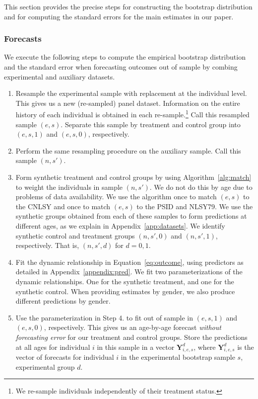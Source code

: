 \noindent This section provides the precise steps for constructing the bootstrap distribution and for computing the standard errors for the main estimates in our paper.

\subsubsection{Forecasts} \label{appendix:bootstrapspreds}

\noindent We execute the following steps to compute the empirical bootstrap distribution and the standard error when forecasting outcomes out of sample by combing experimental and auxiliary datasets.

\begin{enumerate}
\item Resample the experimental sample with replacement at the individual level. This gives us a new (re-sampled) panel dataset. Information on the entire history of each individual is obtained in each re-sample.\footnote{We re-sample individuals independently of their treatment status.} Call this resampled sample $(e,s)$. Separate this sample by treatment and control group into $(e,s,1)$ and $(e,s,0)$, respectively.

\item Perform the same resampling procedure on the auxiliary sample. Call this sample $(n,s')$.

\item Form synthetic treatment and control groups by using Algorithm~\ref{alg:match} to weight the individuals in sample $(n,s')$. We do not do this by age due to problems of data availability. We use the algorithm once to match $(e,s)$ to the CNLSY and once to match $(e,s)$ to the PSID and NLSY79. We use the synthetic groups obtained from each of these samples to form predictions at different ages, as we explain in Appendix~\ref{app:datasets}. We identify synthetic control and treatment groups $(n,s',0)$ and $(n,s',1)$, respectively. That is, $(n,s',d)$ for $d = {0,1}$.

\item Fit the dynamic relationship in Equation~\eqref{eq:outcome}, using predictors as detailed in Appendix~\ref{appendix:pred}. We fit two parameterizations of the dynamic relationships. One for the synthetic treatment, and one for the synthetic control. When providing estimates by gender, we also produce different predictions by gender.

\item Use the parameterization in Step 4. to fit out of sample in $(e,s,1)$ and $(e,s,0)$, respectively. This gives us an age-by-age forecast \textit{without forecasting error} for our treatment and control groups. Store the predictions at all ages for individual $i$ in this sample in a vector $\bm{Y}_{i,e,s}^d$, where $\bm{Y}_{i,e,s}^d$ is the vector of forecasts for individual $i$ in the experimental bootstrap sample $s$, experimental group $d$.


\end{enumerate}

